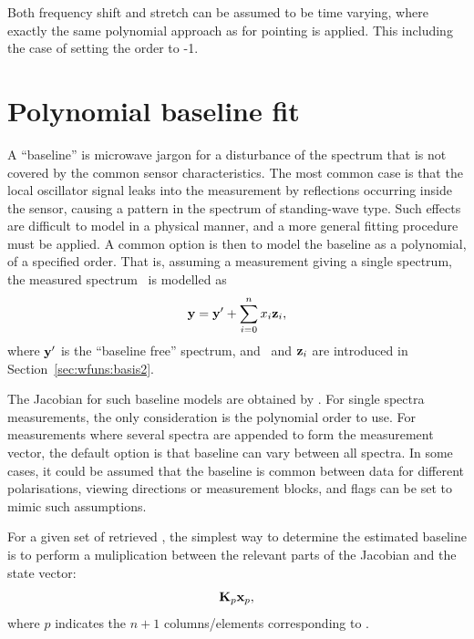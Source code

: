 Both frequency shift and stretch can be assumed to be time varying, where
exactly the same polynomial approach as for pointing is applied. This
including the case of setting the order to -1.




\section{Polynomial baseline fit}
\label{sec:wfuns:polyfit}

A ``baseline'' is microwave jargon for a disturbance of the spectrum that is
not covered by the common sensor characteristics. The most common case is that
the local oscillator signal leaks into the measurement by reflections occurring
inside the sensor, causing a pattern in the spectrum of standing-wave type.
Such effects are difficult to model in a physical manner, and a more general
fitting procedure must be applied. A common option is then to model the
baseline as a polynomial, of a specified order. That is, assuming a measurement
giving a single spectrum, the measured spectrum \MsrVct\ is modelled as
\begin{equation}
  \label{eq:polyfit}
  \mathbf{y} = \mathbf{y}' + \sum_{i=0}^n x_{i}\mathbf{z}_i,
\end{equation}
where $\mathbf{y}'$ is the ``baseline free'' spectrum, and \ and
$\mathbf{z}_i$ are introduced in Section~\ref{sec:wfuns:basis2}.

The Jacobian for such baseline models are obtained by
. For single spectra measurements, the only
consideration is the polynomial order to use. For measurements where several
spectra are appended to form the measurement vector, the default option is that
baseline can vary between all spectra. In some cases, it could be assumed that
the baseline is common between data for different polarisations, viewing
directions or measurement blocks, and flags can be set to mimic such
assumptions.

For a given set of retrieved , the simplest way to determine the
estimated baseline is to perform a muliplication between the relevant parts of
the Jacobian and the state vector:
\begin{equation}
  \mathbf{K}_{p}\mathbf{x}_{p},
  \label{eq:bline:recreate}
\end{equation}
where $p$ indicates the $n+1$ columns/elements corresponding to .


